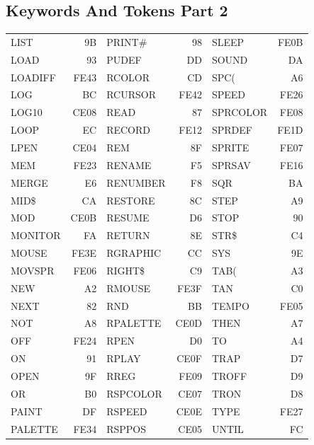 \subsection{Keywords And Tokens Part 2}
{\ttfamily
\setlength{\tabcolsep}{1mm}
\begin{tabular}{|p{2.2cm}r|p{2.2cm}r|p{2.2cm}r|}
\hline
LIST       &   9B &PRINT\#    &   98 &SLEEP      & FE0B \\
LOAD       &   93 &PUDEF      &   DD &SOUND      &   DA \\
LOADIFF    & FE43 &RCOLOR     &   CD &SPC(       &   A6 \\
LOG        &   BC &RCURSOR    & FE42 &SPEED      & FE26 \\
LOG10      & CE08 &READ       &   87 &SPRCOLOR   & FE08 \\
LOOP       &   EC &RECORD     & FE12 &SPRDEF     & FE1D \\
LPEN       & CE04 &REM        &   8F &SPRITE     & FE07 \\
MEM        & FE23 &RENAME     &   F5 &SPRSAV     & FE16 \\
MERGE      &   E6 &RENUMBER   &   F8 &SQR        &   BA \\
MID\$      &   CA &RESTORE    &   8C &STEP       &   A9 \\
MOD        & CE0B &RESUME     &   D6 &STOP       &   90 \\
MONITOR    &   FA &RETURN     &   8E &STR\$      &   C4 \\
MOUSE      & FE3E &RGRAPHIC   &   CC &SYS        &   9E \\
MOVSPR     & FE06 &RIGHT\$    &   C9 &TAB(       &   A3 \\
NEW        &   A2 &RMOUSE     & FE3F &TAN        &   C0 \\
NEXT       &   82 &RND        &   BB &TEMPO      & FE05 \\
NOT        &   A8 &RPALETTE   & CE0D &THEN       &   A7 \\
OFF        & FE24 &RPEN       &   D0 &TO         &   A4 \\
ON         &   91 &RPLAY      & CE0F &TRAP       &   D7 \\
OPEN       &   9F &RREG       & FE09 &TROFF      &   D9 \\
OR         &   B0 &RSPCOLOR   & CE07 &TRON       &   D8 \\
PAINT      &   DF &RSPEED     & CE0E &TYPE       & FE27 \\
PALETTE    & FE34 &RSPPOS     & CE05 &UNTIL      &   FC \\

\end{tabular}}
